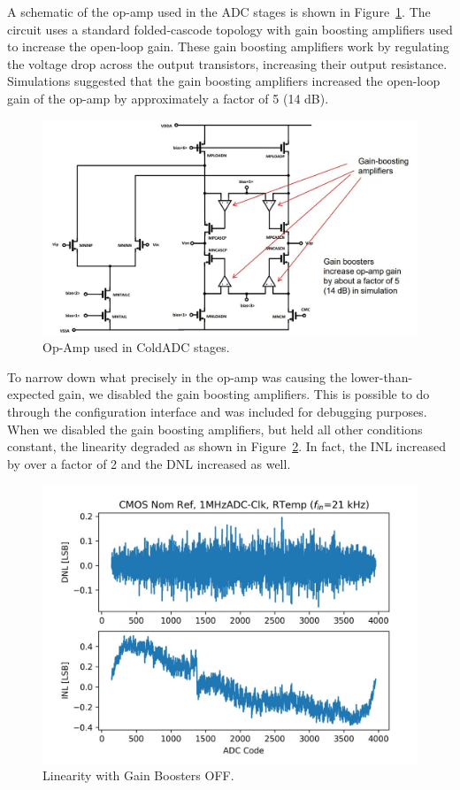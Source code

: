 A schematic of the op-amp used in the ADC stages is shown in Figure~\ref{fig:op_amp_1}. The circuit uses a standard folded-cascode topology with gain boosting amplifiers used to increase the open-loop gain. These gain boosting amplifiers work by regulating the voltage drop across the output transistors, increasing their output resistance. Simulations suggested that the gain boosting amplifiers increased the open-loop gain of the op-amp by approximately a factor of 5 (14 dB).

\begin{figure}[h!]
\centering
  \includegraphics[width=0.9\linewidth]{figures/prakash_fig/op_amp.JPG}
  \caption{Op-Amp used in ColdADC stages.}
  \label{fig:op_amp_1}
\end{figure}

To narrow down what precisely in the op-amp was causing the lower-than-expected gain, we disabled the gain boosting amplifiers. This is possible to do through the configuration interface and was included for debugging purposes. When we disabled the gain boosting amplifiers, but held all other conditions constant, the linearity degraded as shown in Figure~\ref{fig:linearity_GB_OFF}. In fact, the INL increased by over a factor of 2 and the DNL increased as well.


\begin{figure}[h!]
\centering
  \includegraphics[width=0.7\linewidth]{figures/prakash_fig/linearity_GB_OFF.JPG}
  \caption{Linearity with Gain Boosters OFF.}
  \label{fig:linearity_GB_OFF}
\end{figure}

